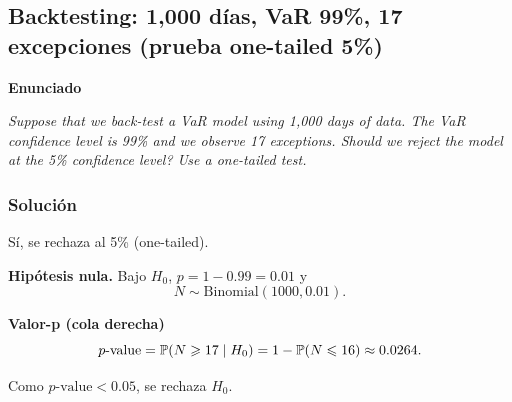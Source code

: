 ﻿\subsection{Backtesting: 1,000 días, VaR 99\%, 17 excepciones (prueba one-tailed 5\%)}

\textbf{Enunciado}

\emph{Suppose that we back-test a VaR model using 1,000 days of data. The VaR confidence level is 99\% and we observe 17 exceptions. Should we reject the model at the 5\% confidence level? Use a one-tailed test.}

\subsubsection*{Solución}

Sí, se rechaza al 5\% (one-tailed).


\textbf{Hipótesis nula. }Bajo \(H_0\), \(p=1-0.99=0.01\) y
\[
N\sim \mathrm{Binomial}(1000,0.01).
\]

\textbf{Valor-p (cola derecha)}\\
\[
p\text{-value}=\mathbb{P}(N\geqslant 17\mid H_0)=1-\mathbb{P}(N\leqslant 16)\approx 0.0264.
\]


Como \(p\text{-value}<0.05\), se rechaza \(H_0\).









